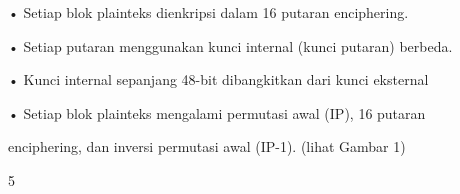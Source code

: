 \documentclass{article}
\begin{document}

• Setiap blok plainteks dienkripsi dalam 16 putaran enciphering.

• Setiap putaran menggunakan kunci internal (kunci putaran) berbeda.

• Kunci internal sepanjang 48-bit dibangkitkan dari kunci eksternal

• Setiap blok plainteks mengalami permutasi awal (IP), 16 putaran 

enciphering, dan inversi permutasi awal (IP-1).  (lihat Gambar 1)

5
\end{document}
